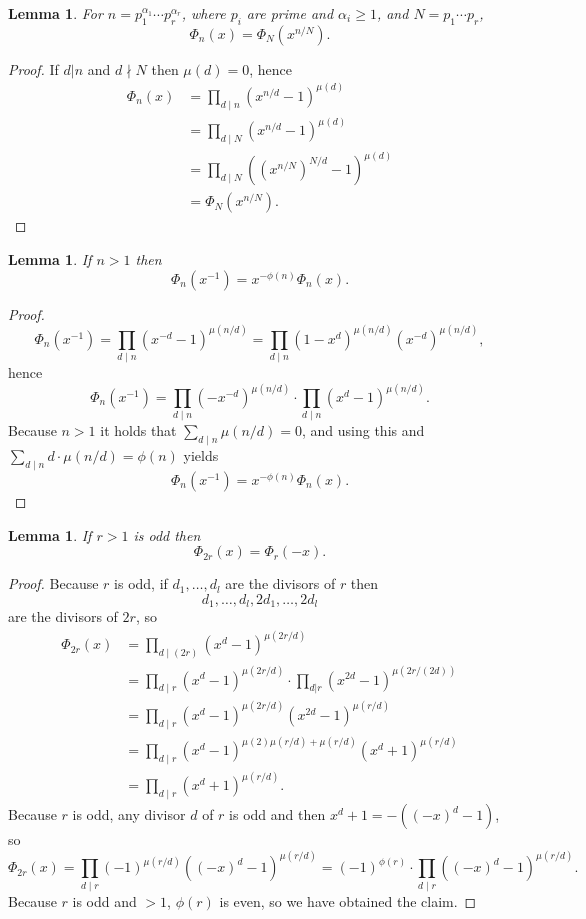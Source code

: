 \documentclass{article}
\newtheorem{lemma}[theorem]{Lemma}
\theoremstyle{definition}
\begin{document}
\begin{lemma}
For $n=p_1^{\alpha_1} \cdots p_r^{\alpha_r}$, where $p_i$ are prime and $\alpha_i \geq 1$, and
$N=p_1 \cdots p_r$,
\[
\Phi_n(x) = \Phi_N(x^{n/N}).
\]
\label{radical}
\end{lemma}
\begin{proof}
If $d|n$ and $d \nmid N$ then $\mu(d)=0$, hence
\begin{align*}
\Phi_n(x)&=\prod_{d \mid n} (x^{n/d}-1)^{\mu(d)}\\
&=\prod_{d \mid N} (x^{n/d}-1)^{\mu(d)}\\
&=\prod_{d \mid N} ((x^{n/N})^{N/d}-1)^{\mu(d)}\\
&=\Phi_N(x^{n/N}).
\end{align*}
\end{proof}


\begin{lemma}
If $n > 1$ then 
\[
 \Phi_n(x^{-1}) =x^{-\phi(n)} \Phi_n(x).
\]
\label{reciprocal}
\end{lemma}
\begin{proof}
\[
\Phi_n(x^{-1}) = \prod_{d \mid n} (x^{-d}-1)^{\mu(n/d)} = \prod_{d \mid n} (1-x^d)^{\mu(n/d)} (x^{-d})^{\mu(n/d)},
\]
hence
\[
\Phi_n(x^{-1}) = \prod_{d \mid n} (-x^{-d})^{\mu(n/d)} \cdot \prod_{d \mid n} (x^d-1)^{\mu(n/d)}.
\]
Because $n>1$ it holds that $\sum_{d \mid n} \mu(n/d) = 0$, and using this and
$\sum_{d \mid n} d\cdot \mu(n/d) = \phi(n)$ yields
\[
\Phi_n(x^{-1}) = x^{-\phi(n)} \Phi_n(x).
\]
\end{proof}



\begin{lemma}
If $r>1$ is odd then
\[
\Phi_{2r}(x) = \Phi_r(-x).
\]
\label{twiceodd}
\end{lemma}
\begin{proof}
Because $r$ is odd, if $d_1,\ldots,d_l$ are the divisors of $r$ then
\[
d_1,\ldots,d_l,2d_1,\ldots,2d_l
\]
 are the divisors of $2r$, so
\begin{align*}
\Phi_{2r}(x)&=\prod_{d \mid (2r)} (x^d-1)^{\mu(2r/d)}\\
&=\prod_{d \mid r} (x^d-1)^{\mu(2r/d)} \cdot \prod_{d|r} (x^{2d}-1)^{\mu(2r/(2d))}\\
&=\prod_{d \mid r} (x^d-1)^{\mu(2r/d)} (x^{2d}-1)^{\mu(r/d)}\\
&=\prod_{d \mid r} (x^d-1)^{\mu(2) \mu(r/d)+\mu(r/d)} (x^d+1)^{\mu(r/d)}\\
&=\prod_{d \mid r} (x^d+1)^{\mu(r/d)}.
\end{align*}
Because $r$ is odd, any divisor $d$ of $r$ is odd and then $x^d+1 = -((-x)^d-1)$, so
\[
\Phi_{2r}(x) = \prod_{d \mid r} (-1)^{\mu(r/d)} ((-x)^d-1)^{\mu(r/d)}
=(-1)^{\phi(r)} \cdot \prod_{d \mid r} ((-x)^d-1)^{\mu(r/d)}.
\] 
Because $r$ is odd and $>1$, $\phi(r)$ is even, so
we have obtained the claim.
\end{proof}
\end{document}
